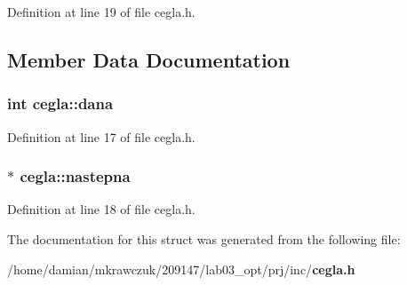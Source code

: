 Definition at line 19 of file cegla.\-h.



\subsection{Member Data Documentation}
\subsubsection[{dana}]{\setlength{\rightskip}{0pt plus 5cm}int cegla\-::dana}\label{structcegla_a25ba885f5ac99791f80fd1676ce22a3a}


Definition at line 17 of file cegla.\-h.

\subsubsection[{nastepna}]{$\ast$ cegla\-::nastepna}\label{structcegla_aca5144299572d01d919e2655e447f9a8}


Definition at line 18 of file cegla.\-h.



The documentation for this struct was generated from the following file\-:\begin{DoxyCompactItemize}
\item 
/home/damian/mkrawczuk/209147/lab03\-\_\-opt/prj/inc/{\bf cegla.\-h}\end{DoxyCompactItemize}
